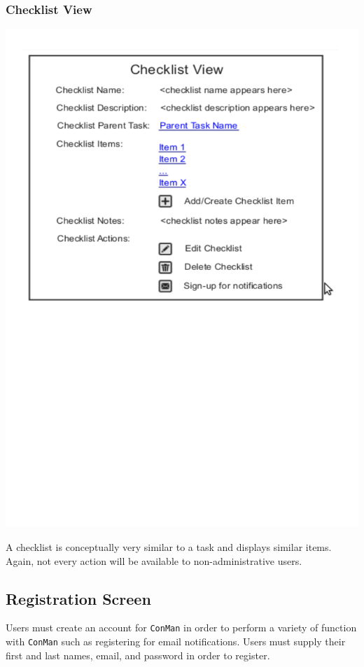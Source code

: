 \documentclass{article}
\begin{document}
\subsubsection{Checklist View}
\begin{center}
\includegraphics[trim = 0cm 12cm 0cm 0cm, clip=true, scale=0.7]{images/checklistview}
\end{center}
A checklist is conceptually very similar to a task and displays similar items.
Again, not every action will be available to non-administrative users.
\subsection{Registration Screen}
Users must create an account for \texttt{ConMan} in order to perform a variety of function with \texttt{ConMan} 
such as registering for email notifications. Users must supply their first and last names, email, and password in 
order to register.
\end{document}
